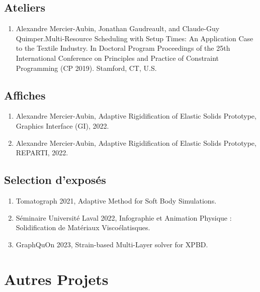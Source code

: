 \documentclass[10pt]{article} %
\begin{document}
\subsection{Ateliers}
\begin{enumerate}
  \setcounter{enumi}{\value{listCounter}}
  \item Alexandre Mercier-Aubin, Jonathan Gaudreault, and Claude-Guy Quimper.Multi-Resource Scheduling with Setup Times:
An Application Case to the Textile Industry. In  Doctoral Program Proceedings of the 25th International
Conference on Principles and Practice of Constraint Programming (CP 2019). Stamford, CT, U.S. 

\end{enumerate}

\subsection{Affiches}
\begin{enumerate}
  \setcounter{enumi}{\value{listCounter}}
  \item Alexandre Mercier-Aubin, Adaptive Rigidification of Elastic Solids Prototype, Graphics Interface (GI), 2022.
  \item Alexandre Mercier-Aubin, Adaptive Rigidification of Elastic Solids Prototype, REPARTI, 2022. 
\end{enumerate}

\subsection{Selection d'exposés}
\begin{enumerate}
  \setcounter{enumi}{\value{listCounter}}
  \item Tomatograph 2021,  Adaptive Method for Soft Body Simulations.
  \item Séminaire Université Laval 2022, Infographie et Animation Physique : Solidification de Matériaux Viscoélatisques.
  \item GraphQuOn 2023, Strain-based Multi-Layer solver for XPBD.
\end{enumerate}


\section{Autres Projets}
\end{document}
